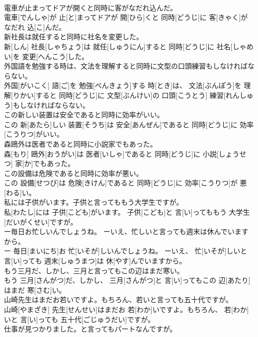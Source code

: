 \documentclass[8pt]{extreport}
\begin{document}
\begin{CJK}{UTF8}{min}
\\	電車が止まってドアが開くと同時に客がなだれ込んだ。	
\\	電車[でんしゃ]が 止[と]まってドアが 開[ひら]くと 同時[どうじ]に 客[きゃく]がなだれ 込[こ]んだ。
\\	新社長は就任すると同時に社名を変更した。	
\\	新[しん] 社長[しゃちょう]は 就任[しゅうにん]すると 同時[どうじ]に 社名[しゃめい]を 変更[へんこう]した。
\\	外国語を勉強する時は、文法を理解すると同時に文型の口頭練習もしなければならない。	
\\	外国[がいこく] 語[ご]を 勉強[べんきょう]する 時[とき]は、 文法[ぶんぽう]を 理解[りかい]すると 同時[どうじ]に 文型[ぶんけい]の 口頭[こうとう] 練習[れんしゅう]もしなければならない。
\\	この新しい装置は安全であると同時に効率がいい。	
\\	この 新[あたら]しい 装置[そうち]は 安全[あんぜん]であると 同時[どうじ]に 効率[こうりつ]がいい。
\\	森鴎外は医者であると同時に小説家でもあった。	
\\	森[もり] 鴎外[おうがい]は 医者[いしゃ]であると 同時[どうじ]に 小説[しょうせつ] 家[か]でもあった。
\\	この設備は危険であると同時に効率が悪い。	
\\	この 設備[せつび]は 危険[きけん]であると 同時[どうじ]に 効率[こうりつ]が 悪[わる]い。
\\	私には子供がいます。子供と言ってももう大学生ですが。	
\\	私[わたし]には 子供[こども]がいます。 子供[こども]と 言[い]ってももう 大学生[だいがくせい]ですが。
\\	ー毎日お忙しいんでしょうね。 ーいえ、忙しいと言っても週末は休んでいますから。	
\\	ー 毎日[まいにち]お 忙[いそが]しいんでしょうね。 ーいえ、 忙[いそが]しいと 言[い]っても 週末[しゅうまつ]は 休[やす]んでいますから。
\\	もう三月だ、しかし、三月と言ってもこの辺はまだ寒い。	
\\	もう 三月[さんがつ]だ、しかし、 三月[さんがつ]と 言[い]ってもこの 辺[あたり]はまだ 寒[さむ]い。
\\	山崎先生はまだお若いですよ。もちろん、若いと言っても五十代ですが。	
\\	山崎[やまざき] 先生[せんせい]はまだお 若[わか]いですよ。もちろん、 若[わか]いと 言[い]っても 五十代[ごじゅうだい]ですが。
\\	仕事が見つかりました。と言ってもパートなんですが。	

\end{CJK}
\end{document}
